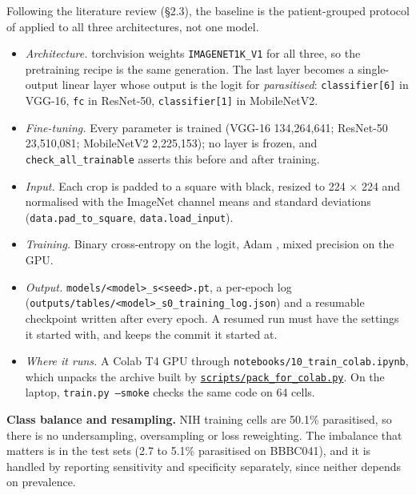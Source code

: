 \documentclass[11pt,a4paper]{article}
\begin{document}
Following the literature review (\S{}2.3), the baseline is the patient-grouped protocol of \citet{hou2026} applied to all three architectures, not one model.

\begin{itemize}
\item \emph{Architecture.} torchvision weights \texttt{IMAGENET1K\_\allowbreak{}V1} for all three, so the pretraining recipe is the same generation. The last layer becomes a single-output linear layer whose output is the logit for \emph{parasitised}: \texttt{classifier[6]} in VGG-16, \texttt{fc} in ResNet-50, \texttt{classifier[1]} in \mbox{MobileNetV2}.
\item \emph{Fine-tuning.} Every parameter is trained (VGG-16 134,264,641; ResNet-50 23,510,081; \mbox{MobileNetV2} 2,225,153); no layer is frozen, and \texttt{check\_\allowbreak{}all\_\allowbreak{}trainable} asserts this before and after training.
\item \emph{Input.} Each crop is padded to a square with black, resized to 224 $\times$ 224 and normalised with the ImageNet channel means and standard deviations (\texttt{data.\allowbreak{}pad\_\allowbreak{}to\_\allowbreak{}square}, \texttt{data.\allowbreak{}load\_\allowbreak{}input}).
\item \emph{Training.} Binary cross-entropy on the logit, Adam \citep{kingma2015}, mixed precision on the GPU.
\item \emph{Output.} \texttt{models/\allowbreak{}<model>\_\allowbreak{}s<seed>.\allowbreak{}pt}, a per-epoch log (\texttt{outputs/\allowbreak{}tables/\allowbreak{}<model>\_\allowbreak{}s0\_\allowbreak{}training\_\allowbreak{}log.\allowbreak{}json}) and a resumable checkpoint written after every epoch. A resumed run must have the settings it started with, and keeps the commit it started at.
\item \emph{Where it runs.} A Colab T4 GPU through \texttt{notebooks/\allowbreak{}10\_\allowbreak{}train\_\allowbreak{}colab.\allowbreak{}ipynb}, which unpacks the archive built by \href{https://github.com/noahtjonsk/malaria-cross-dataset/blob/main/scripts/pack_for_colab.py}{\texttt{scripts/\allowbreak{}pack\_\allowbreak{}for\_\allowbreak{}colab.\allowbreak{}py}}. On the laptop, \texttt{train.\allowbreak{}py --smoke} checks the same code on 64 cells.
\end{itemize}

\textbf{Class balance and resampling.} NIH training cells are 50.1\% parasitised, so there is no undersampling, oversampling or loss reweighting. The imbalance that matters is in the test sets (2.7 to 5.1\% parasitised on BBBC041), and it is handled by reporting sensitivity and specificity separately, since neither depends on prevalence.
\end{document}
